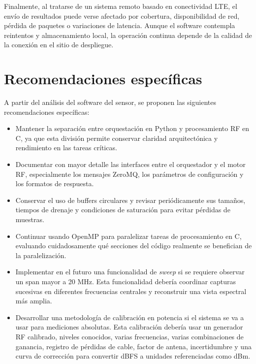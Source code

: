Finalmente, al tratarse de un sistema remoto basado en conectividad LTE, el envío
de resultados puede verse afectado por cobertura, disponibilidad de red, pérdida
de paquetes o variaciones de latencia. Aunque el software contempla reintentos y
almacenamiento local, la operación continua depende de la calidad de la conexión
en el sitio de despliegue.


\section{Recomendaciones específicas}

A partir del análisis del software del sensor, se proponen las siguientes
recomendaciones específicas:

\begin{itemize}
  \item Mantener la separación entre orquestación en Python y procesamiento RF en
  C, ya que esta división permite conservar claridad arquitectónica y rendimiento
  en las tareas críticas.

  \item Documentar con mayor detalle las interfaces entre el orquestador y el
  motor RF, especialmente los mensajes ZeroMQ, los parámetros de configuración y
  los formatos de respuesta.

  \item Conservar el uso de buffers circulares y revisar periódicamente sus
  tamaños, tiempos de drenaje y condiciones de saturación para evitar pérdidas de
  muestras.

  \item Continuar usando OpenMP para paralelizar tareas de procesamiento en C,
  evaluando cuidadosamente qué secciones del código realmente se benefician de la
  paralelización.

  \item Implementar en el futuro una funcionalidad de \textit{sweep} si se requiere
  observar un span mayor a 20 MHz. Esta funcionalidad debería coordinar capturas
  sucesivas en diferentes frecuencias centrales y reconstruir una vista espectral
  más amplia.

  \item Desarrollar una metodología de calibración en potencia si el sistema se va
  a usar para mediciones absolutas. Esta calibración debería usar un generador RF
  calibrado, niveles conocidos, varias frecuencias, varias combinaciones de
  ganancia, registro de pérdidas de cable, factor de antena, incertidumbre y una
  curva de corrección para convertir dBFS a unidades referenciadas como dBm.


\end{itemize}
